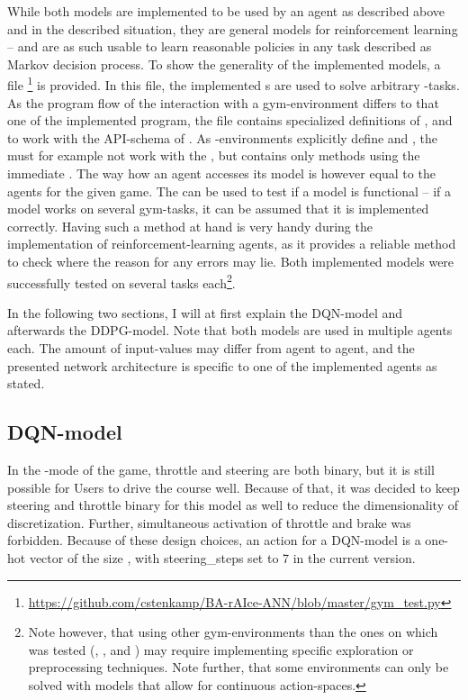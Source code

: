 While both models are implemented to be used by an agent as described above and in the described situation, they are general models for reinforcement learning -- and are as such usable to learn reasonable policies in any task described as Markov decision process. To show the generality of the implemented models, a file \footnote{\url{https://github.com/cstenkamp/BA-rAIce-ANN/blob/master/gym\_test.py}} is provided. In this file, the implemented s are used to solve arbitrary -tasks. As the program flow of the interaction with a gym-environment differs to that one of the implemented program, the file contains specialized definitions of ,  and  to work with the API-schema of . As -environments explicitly define  and , the  must for example not work with the , but contains only methods using the immediate . The way how an agent accesses its model is however equal to the agents for the given game. The  can be used to test if a model is functional -- if a model works on several gym-tasks, it can be assumed that it is implemented correctly. Having such a method at hand is very handy during the implementation of reinforcement-learning agents, as it provides a reliable method to check where the reason for any errors may lie. Both implemented models were successfully tested on several tasks each\footnote{Note however, that using other gym-environments than the ones on which was tested (, ,  and ) may require implementing specific exploration or preprocessing techniques. Note further, that some environments can only be solved with models that allow for continuous action-spaces.}.


In the following two sections, I will at first explain the DQN-model and afterwards the DDPG-model. Note that both models are used in multiple agents each. The amount of input-values may differ from agent to agent, and the presented network architecture is specific to one of the implemented agents as stated.


\subsection{DQN-model}

In the -mode of the game, throttle and steering are both binary, but it is still possible for Users to drive the course well. Because of that, it was decided to keep steering and throttle binary for this model as well to reduce the dimensionality of discretization. Further, simultaneous activation of throttle and brake was forbidden. Because of these design choices, an action for a DQN-model is a one-hot vector of the size , with steering\_steps set to 7 in the current version. 

